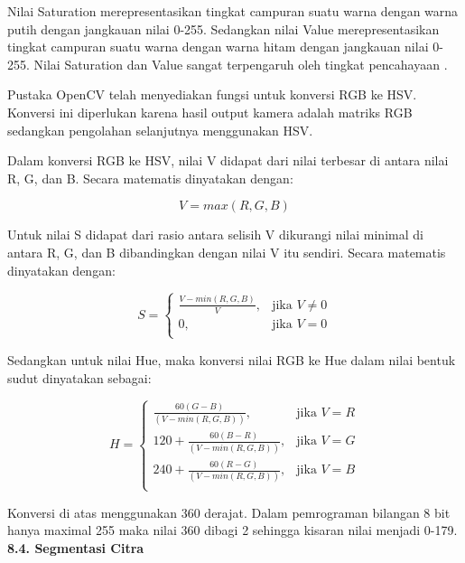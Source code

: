 \documentclass[a4paper,12pt]{article}
\begin{document}
Nilai Saturation merepresentasikan tingkat campuran suatu warna dengan warna putih dengan jangkauan nilai 0-255.
Sedangkan nilai Value merepresentasikan tingkat campuran suatu warna dengan warna hitam dengan jangkauan nilai 0-255.
Nilai Saturation dan Value sangat terpengaruh oleh tingkat pencahayaan \cite{opencv_intro} .

Pustaka OpenCV telah menyediakan fungsi untuk konversi RGB ke HSV.
Konversi ini diperlukan karena hasil output kamera adalah matriks RGB sedangkan pengolahan selanjutnya menggunakan HSV.

Dalam konversi RGB ke HSV, nilai V didapat dari nilai terbesar di antara nilai R, G, dan B. 
Secara matematis dinyatakan dengan:

\begin{equation}
  V = max(R,G,B)
\end{equation}

Untuk nilai S didapat dari rasio antara selisih V dikurangi nilai minimal di antara R, G, dan B dibandingkan dengan nilai V itu sendiri.
Secara matematis dinyatakan dengan:

\begin{equation}
  S =  
  \begin{cases}
      \frac{V-min(R,G,B)}{V},& \text{jika } V\neq 0\\
      0,              & \text{jika } V = 0\\
  \end{cases}
\end{equation}


Sedangkan untuk nilai Hue, maka konversi nilai RGB ke Hue dalam nilai bentuk sudut dinyatakan sebagai:

\begin{equation}
  H =  
  \begin{cases}
      \frac{60(G-B)}{(V-min(R,G,B))},& \text{jika } V = R\\
      120 + \frac{60(B-R)}{(V-min(R,G,B))},& \text{jika } V = G\\
      240 + \frac{60(R-G)}{(V-min(R,G,B))},& \text{jika } V = B\\
  \end{cases}
\end{equation}

Konversi di atas menggunakan 360 derajat.
Dalam pemrograman bilangan 8 bit hanya maximal 255 maka nilai 360 dibagi 2 sehingga kisaran nilai menjadi 0-179.
\\[10pt]
\indent \textbf{8.4. \hspace{8pt} Segmentasi Citra}
\end{document}
